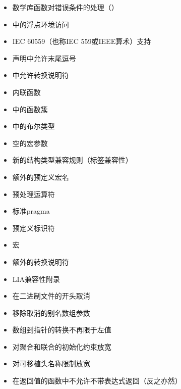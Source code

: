 \begin{itemize}
  \item{数学库函数对错误条件的处理（）}
  \item{中的浮点环境访问}
  \item{IEC 60559（也称IEC 559或IEEE算术）支持}
  \item{声明中允许末尾逗号}
  \item{中允许转换说明符}
  \item{内联函数}
  \item{中的函数簇}
  \item{中的布尔类型}
  \item{空的宏参数}
  \item{新的结构类型兼容规则（标签兼容性）}
  \item{额外的预定义宏名}
  \item{预处理运算符}
  \item{标准pragma}
  \item{预定义标识符}
  \item{宏}
  \item{额外的转换说明符}
  \item{LIA兼容性附录}
  \item{在二进制文件的开头取消}
  \item{移除取消的别名数组参数}
  \item{数组到指针的转换不再限于左值}
  \item{对聚合和联合的初始化约束放宽}
  \item{对可移植头名称限制放宽}
  \item{在返回值的函数中不允许不带表达式返回（反之亦然）}
\end{itemize}
